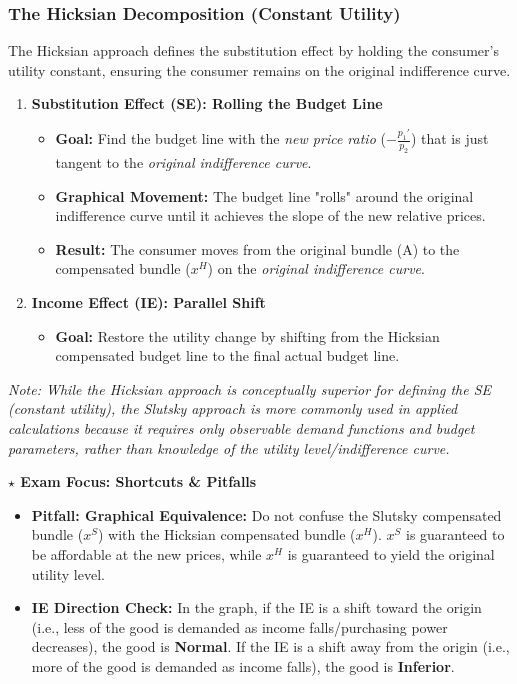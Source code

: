 \documentclass{article}
\begin{document}
\subsubsection*{The Hicksian Decomposition (Constant Utility)}

The Hicksian approach defines the substitution effect by holding the consumer's utility constant, ensuring the consumer remains on the original indifference curve.

\begin{enumerate}
    \item \textbf{Substitution Effect (SE): Rolling the Budget Line}
    \begin{itemize}
        \item \textbf{Goal:} Find the budget line with the \textit{new price ratio} ($-\frac{p_1'}{p_2}$) that is just tangent to the \textit{original indifference curve}.
        \item \textbf{Graphical Movement:} The budget line "rolls" around the original indifference curve until it achieves the slope of the new relative prices.
        \item \textbf{Result:} The consumer moves from the original bundle (A) to the compensated bundle ($x^H$) on the \textit{original indifference curve}.
    \end{itemize}
    \item \textbf{Income Effect (IE): Parallel Shift}
    \begin{itemize}
        \item \textbf{Goal:} Restore the utility change by shifting from the Hicksian compensated budget line to the final actual budget line.
    \end{itemize}
\end{enumerate}

\textit{Note: While the Hicksian approach is conceptually superior for defining the SE (constant utility), the Slutsky approach is more commonly used in applied calculations because it requires only observable demand functions and budget parameters, rather than knowledge of the utility level/indifference curve.}

\vspace{1em}
\textbf{$\star$ Exam Focus: Shortcuts \& Pitfalls}

\begin{itemize}
    \item \textbf{Pitfall: Graphical Equivalence:} Do not confuse the Slutsky compensated bundle ($x^S$) with the Hicksian compensated bundle ($x^H$). $x^S$ is guaranteed to be affordable at the new prices, while $x^H$ is guaranteed to yield the original utility level.
    \item \textbf{IE Direction Check:} In the graph, if the IE is a shift toward the origin (i.e., less of the good is demanded as income falls/purchasing power decreases), the good is \textbf{Normal}. If the IE is a shift away from the origin (i.e., more of the good is demanded as income falls), the good is \textbf{Inferior}.
\end{itemize}
\end{document}
